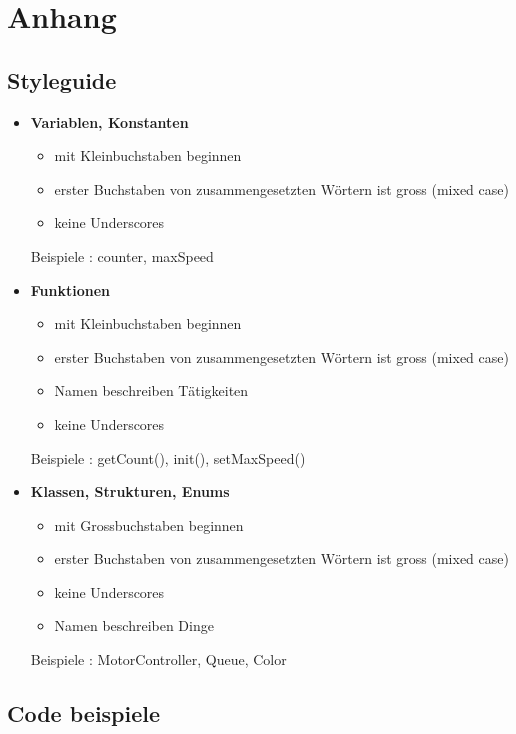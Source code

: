 \section{Anhang}

\subsection{Styleguide}

\begin{itemize}[itemsep=1pt, parsep=0pt]
    \item \textbf{Variablen, Konstanten}
    \begin{itemize}[itemsep=1pt, parsep=0pt]
        \item mit Kleinbuchstaben beginnen
        \item erster Buchstaben von zusammengesetzten Wörtern ist gross (mixed case)
        \item keine Underscores
    \end{itemize}
    Beispiele : counter, maxSpeed
    \item \textbf{Funktionen}
    \begin{itemize}[itemsep=1pt, parsep=0pt]
        \item mit Kleinbuchstaben beginnen
        \item erster Buchstaben von zusammengesetzten Wörtern ist gross (mixed case)
        \item Namen beschreiben Tätigkeiten
        \item keine Underscores
    \end{itemize}
    Beispiele : getCount(), init(), setMaxSpeed()
    \item \textbf{Klassen, Strukturen, Enums}
    \begin{itemize}[itemsep=1pt, parsep=0pt]
        \item mit Grossbuchstaben beginnen
        \item erster Buchstaben von zusammengesetzten Wörtern ist gross (mixed case)
        \item keine Underscores
        \item Namen beschreiben Dinge
    \end{itemize}
    Beispiele : MotorController, Queue, Color
\end{itemize}

\subsection{Code beispiele}

